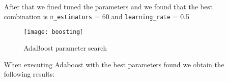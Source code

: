After that we fined tuned the parameters and we found that the best combination is \texttt{n\_estimators} = 60 and \texttt{learning\_rate} = 0.5

\begin{figure}[H]
\centering
\texttt{[image: boosting]}
\caption{AdaBoost parameter search}%
\label{fig:boosting}
\end{figure}

When executing Adaboost with the best parameters found we obtain the following results:



